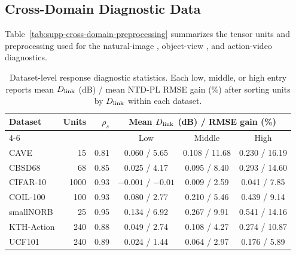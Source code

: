 \subsection{Cross-Domain Diagnostic Data}
\label{supp:cross-domain-details}

Table~\ref{tab:supp-cross-domain-preprocessing} summarizes the tensor units and
preprocessing used for the natural-image
\cite{martin2001database,krizhevsky2009learning}, object-view
\cite{nene1996coil100,LeCun2004SmallNORB}, and action-video
\cite{Schuldt2004KTHActions,Soomro2012UCF101} diagnostics.

\begin{table}[!t]
  \centering
  \caption{Cross-domain data construction and preprocessing for the response
  diagnostic.}
  \label{tab:supp-cross-domain-preprocessing}
  \scriptsize
  \renewcommand{\arraystretch}{1.05}
  \setlength{\tabcolsep}{3.0pt}
  
\end{table}

\begin{table}[!t]
  \centering
  \caption{Dataset-level response diagnostic statistics. Each low, middle, or
  high entry reports mean \(D_{\mathrm{link}}\) (dB) / mean NTD-PL RMSE gain (\%) after sorting
  units by \(D_{\mathrm{link}}\) within each dataset.}
  \label{tab:supp-response-diagnostic-stats}
  \scriptsize
  \renewcommand{\arraystretch}{1.10}
  \setlength{\tabcolsep}{2.5pt}
  \begin{tabular}{@{}l r r c c c@{}}
  \toprule
  Dataset & Units & \(\rho_s\)
    & \multicolumn{3}{c}{Mean \(D_{\mathrm{link}}\) (dB) / RMSE gain (\%)} \\
  \cmidrule(lr){4-6}
  & & & Low & Middle & High \\
  \midrule
  CAVE & 15 & 0.81 & 0.060 / 5.65 & 0.108 / 11.68 & 0.230 / 16.19 \\
  CBSD68 & 68 & 0.85 & 0.025 / 4.17 & 0.095 / 8.40 & 0.293 / 14.60 \\
  CIFAR-10 & 1000 & 0.93 & $-0.001$ / $-0.01$ & 0.009 / 2.59 & 0.041 / 7.85 \\
  COIL-100 & 100 & 0.93 & 0.080 / 2.77 & 0.210 / 5.46 & 0.439 / 9.14 \\
  smallNORB & 25 & 0.95 & 0.134 / 6.92 & 0.267 / 9.91 & 0.541 / 14.16 \\
  KTH-Action & 240 & 0.88 & 0.049 / 2.74 & 0.108 / 4.27 & 0.274 / 10.87 \\
  UCF101 & 240 & 0.89 & 0.024 / 1.44 & 0.064 / 2.97 & 0.176 / 5.89 \\
  \bottomrule
  \end{tabular}
\end{table}

